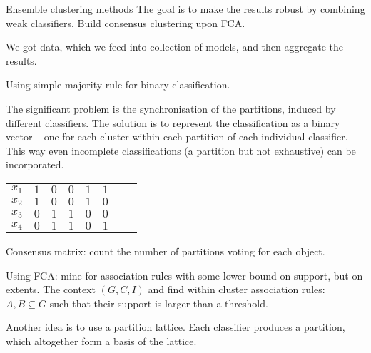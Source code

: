 \documentclass[a4paper]{article}
\begin{document}
Ensemble clustering methods
The goal is to make the results robust by combining weak classifiers.
Build consensus clustering upon FCA.

We got data, which we feed into collection of models, and then aggregate the results.

Using simple majority rule for binary classification.

The significant problem is the synchronisation of the partitions, induced by different classifiers.
The solution is to represent the classification as a binary vector -- one for each cluster within 
each partition of each individual classifier. This way even incomplete classifications (a partition
but not exhaustive) can be incorporated.
\begin{tabular}{c|c|c||c|c|c||c|c|}
$x_1$ & $1$ & $0$ & $0$ & $1$ & $1$ \\
$x_2$ & $1$ & $0$ & $0$ & $1$ & $0$ \\
$x_3$ & $0$ & $1$ & $1$ & $0$ & $0$ \\
$x_4$ & $0$ & $1$ & $1$ & $0$ & $1$
\end{tabular}

Consensus matrix: count the number of partitions voting for each object.

Using FCA: mine for association rules with some lower bound on support, but on extents.
The context $(G,C,I)$ and find within cluster association rules: $A,B\subseteq G$ such
that their support is larger than a threshold.

Another idea is to use a partition lattice. Each classifier produces a partition, which
altogether form a basis of the lattice. 

\end{document}
